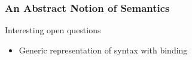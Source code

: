 \documentclass[xetex, mathserif, serif]{beamer}
\begin{document}
  \begin{frame}\frametitle{An Abstract Notion of Semantics}
    \unskip
    \vspace{-2.5em}\unskip
    \vspace{-2.5em}\unskip
    \vspace{-2.5em}\unskip
  \end{frame}

  \begin{frame}{Interesting open questions}
    \begin{itemize}
      \item Generic representation of syntax with binding
    \end{itemize}
  \end{frame}
\end{document}
